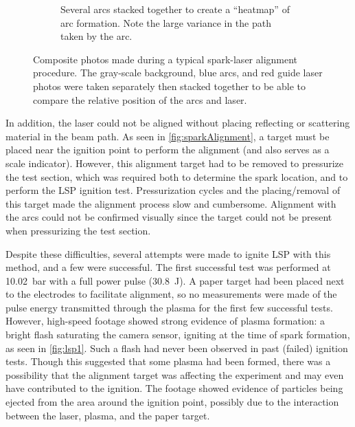 \begin{figure}[h]
\begin{subfigure}[t]{0.47\textwidth}
                \caption{Several arcs stacked together to create a ``heatmap'' of arc formation. Note the large variance in the path taken by the arc.}
                \label{fig:sparkAlignment_heatmap}
            \end{subfigure}
            \caption[Composite photos made during a typical spark-laser alignment procedure]{Composite photos made during a typical spark-laser alignment procedure. The gray-scale background, blue arcs, and red guide laser photos were taken separately then stacked together to be able to compare the relative position of the arcs and laser.}
            \label{fig:sparkAlignment}
        \end{figure}

        In addition, the laser could not be aligned without placing reflecting or scattering material in the beam path. As seen in \autoref{fig:sparkAlignment}, a target must be placed near the ignition point to perform the alignment (and also serves as a scale indicator). However, this alignment target had to be removed to pressurize the test section, which was required both to determine the spark location, and to perform the LSP ignition test. Pressurization cycles and the placing/removal of this target made the alignment process slow and cumbersome. Alignment with the arcs could not be confirmed visually since the target could not be present when pressurizing the test section.

        Despite these difficulties, several attempts were made to ignite LSP with this method, and a few were successful. The first successful test was performed at \qty{10.02}{bar} with a full power pulse (\qty{30.8}{J}). A paper target had been placed next to the electrodes to facilitate alignment, so no measurements were made of the pulse energy transmitted through the plasma for the first few successful tests. However, high-speed footage showed strong evidence of plasma formation: a bright flash saturating the camera sensor, igniting at the time of spark formation, as seen in \autoref{fig:lsp1}. Such a flash had never been observed in past (failed) ignition tests. Though this suggested that some plasma had been formed, there was a possibility that the alignment target was affecting the experiment and may even have contributed to the ignition. The footage showed evidence of particles being ejected from the area around the ignition point, possibly due to the interaction between the laser, plasma, and the paper target.

